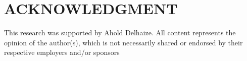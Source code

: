 \section*{ACKNOWLEDGMENT}
\label{sec:acknowledgment}
%
This research was supported by Ahold Delhaize. All content represents the opinion of the author(s), which is not necessarily shared or endorsed by their respective employers and/or sponsors





